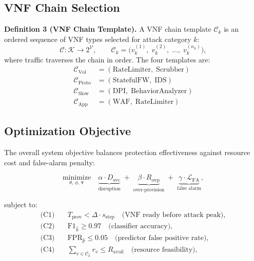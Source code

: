 \documentclass[12pt, a4paper]{article}
\begin{document}
\subsection{VNF Chain Selection}

\textbf{Definition 3 (VNF Chain Template).}
A VNF chain template $\mathcal{C}_k$ is an ordered sequence of VNF types
selected for attack category $k$:
\begin{equation}
  \mathcal{C}\!: \mathcal{K} \rightarrow 2^{\mathcal{V}},
  \qquad
  \mathcal{C}_k = \bigl(v^{(1)}_k,\; v^{(2)}_k,\; \ldots,\; v^{(n_k)}_k\bigr),
  \label{eq:vnf_template}
\end{equation}
where traffic traverses the chain in order. The four templates are:
\begin{align}
  \mathcal{C}_{\text{Vol}}   &= (\text{RateLimiter},\; \text{Scrubber}) \label{eq:tmpl1}\\
  \mathcal{C}_{\text{Proto}} &= (\text{StatefulFW},\; \text{IDS}) \label{eq:tmpl2}\\
  \mathcal{C}_{\text{Slow}}  &= (\text{DPI},\; \text{BehaviorAnalyzer}) \label{eq:tmpl3}\\
  \mathcal{C}_{\text{App}}   &= (\text{WAF},\; \text{RateLimiter}) \label{eq:tmpl4}
\end{align}

\subsection{Optimization Objective}

The overall system objective balances protection effectiveness against
resource cost and false-alarm penalty:

\begin{equation}
  \underset{\theta,\,\phi,\,\boldsymbol{\tau}}{\text{minimize}}\quad
  \underbrace{\alpha \cdot D_{\mathrm{svc}}}_{\text{disruption}} \;+\;
  \underbrace{\beta \cdot R_{\mathrm{ovp}}}_{\text{over-provision}} \;+\;
  \underbrace{\gamma \cdot \mathcal{L}_{\mathrm{FA}}}_{\text{false alarm}},
  \label{eq:objective}
\end{equation}

\noindent subject to:
\begin{align}
  \text{(C1)}\quad & T_{\mathrm{prov}} < \Delta \cdot s_{\mathrm{step}}
    \quad \text{(VNF ready before attack peak)}, \label{eq:c1}\\
  \text{(C2)}\quad & \text{F1}_{\hat{k}} \geq 0.97
    \quad \text{(classifier accuracy)}, \label{eq:c2}\\
  \text{(C3)}\quad & \text{FPR}_{\hat{p}} \leq 0.05
    \quad \text{(predictor false positive rate)}, \label{eq:c3}\\
  \text{(C4)}\quad & \sum_{v \in \mathcal{C}_{\hat{k}}} r_v \leq R_{\mathrm{avail}}
    \quad \text{(resource feasibility)},\label{eq:c4}
\end{align}
\end{document}
